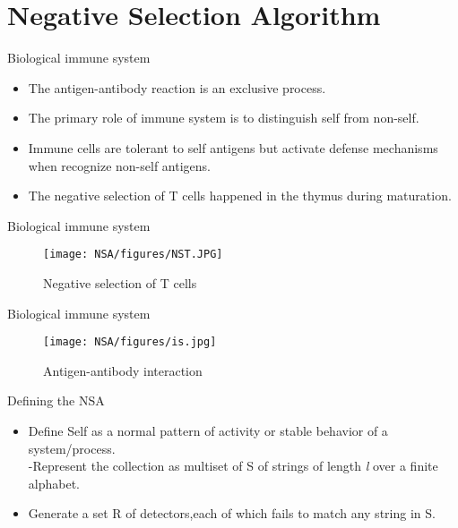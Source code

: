 \section{Negative Selection Algorithm}

\begin{frame}{Biological immune system}
  \begin{itemize}
  \item {
    The antigen-antibody reaction is an exclusive process.
  }
  \item {
    The primary role of immune system is to distinguish self from non-self.
  }
  \item {
    Immune cells are tolerant to self antigens but activate defense mechanisms when recognize non-self antigens.   
  }
  \item {
    The negative selection of T cells happened in the thymus during maturation.
  }
  \end{itemize}
\end{frame}

\begin{frame}{Biological immune system}
  \begin{figure}[hb]
  \centering
  \texttt{[image: NSA/figures/NST.JPG]}
  \caption{Negative selection of T cells}
  \end{figure}
\end{frame}

\begin{frame}{Biological immune system}
  \begin{figure}[hb]
  \centering
  \texttt{[image: NSA/figures/is.jpg]}
  \caption{Antigen-antibody interaction}
  \end{figure}
\end{frame}

\begin{frame}{Defining the NSA}
  \begin{itemize}
  \item<1->{
    Define Self as a normal pattern of activity or stable behavior of a system/process.\\
    -Represent the collection as multiset of S of strings of length \emph{l} over a finite alphabet.
  }
  \item<2-> {   
    Generate a set R of detectors,each of which fails to match any string in S.
  }
  
  \end{itemize}
\end{frame}
 
